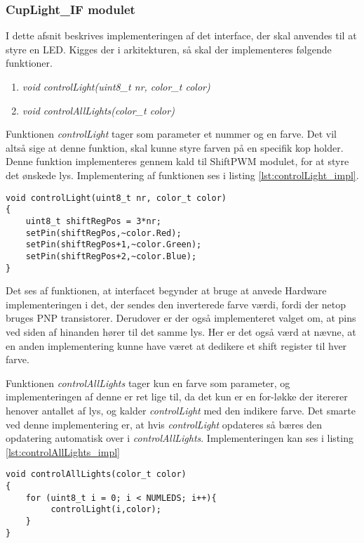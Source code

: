 \documentclass[Softwaredesign/Softwaredesign_main.tex]{subfiles}
\begin{document}
\subsubsection{CupLight\_IF modulet}
I dette afsnit beskrives implementeringen af det interface, der skal anvendes til at styre en LED. Kigges der i arkitekturen, så skal der implementeres følgende funktioner.
\begin{enumerate}
    \item \textit{void controlLight(uint8\_t nr, color\_t color)}
    \item \textit{void controlAllLights(color\_t color)}
\end{enumerate}

Funktionen \textit{controlLight} tager som parameter et nummer og en farve. Det vil altså sige at denne funktion, skal kunne styre farven på en specifik kop holder. Denne funktion implementeres gennem kald til ShiftPWM modulet, for at styre det ønskede lys. Implementering af funktionen ses i listing \ref{lst:controlLight_impl}.

\begin{lstlisting}[caption={Implementeringen af controlLight}, label={lst:controlLight_impl}]
void controlLight(uint8_t nr, color_t color)
{
    uint8_t shiftRegPos = 3*nr;
    setPin(shiftRegPos,~color.Red);
    setPin(shiftRegPos+1,~color.Green);
    setPin(shiftRegPos+2,~color.Blue);
}
\end{lstlisting}

Det ses af funktionen, at interfacet begynder at bruge at anvede Hardware implementeringen i det, der sendes den inverterede farve værdi, fordi der netop bruges PNP transistorer. Derudover er der også implementeret valget om, at pins ved siden af hinanden hører til det samme lys. Her er det også værd at nævne, at en anden implementering kunne have været at dedikere et shift register til hver farve.

Funktionen \textit{controlAllLights} tager kun en farve som parameter, og implementeringen af denne er ret lige til, da det kun er en for-løkke der itererer henover antallet af lys, og kalder \textit{controlLight} med den indikere farve. Det smarte ved denne implementering er, at hvis \textit{controlLight} opdateres så bæres den opdatering automatisk over i \textit{controlAllLights}.  Implementeringen kan ses i listing \ref{lst:controlAllLights_impl}

\begin{lstlisting}[caption={Implementeringen af controlAllLights}, label={lst:controlAllLights_impl}]
void controlAllLights(color_t color)
{
    for (uint8_t i = 0; i < NUMLEDS; i++){
         controlLight(i,color);
    }
}
\end{lstlisting}
\end{document}
